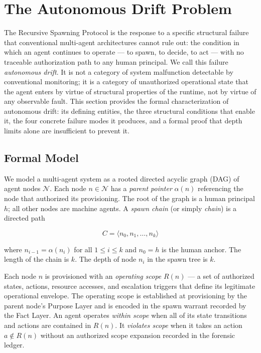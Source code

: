 \section{The Autonomous Drift Problem}
\label{sec:rs-drift}

The Recursive Spawning Protocol is the response to a specific structural failure that conventional multi-agent architectures cannot rule out: the condition in which an agent continues to operate — to spawn, to decide, to act — with no traceable authorization path to any human principal. We call this failure \emph{autonomous drift}. It is not a category of system malfunction detectable by conventional monitoring; it is a category of unauthorized operational state that the agent enters by virtue of structural properties of the runtime, not by virtue of any observable fault. This section provides the formal characterization of autonomous drift: its defining entities, the three structural conditions that enable it, the four concrete failure modes it produces, and a formal proof that depth limits alone are insufficient to prevent it.

\subsection{Formal Model}

We model a multi-agent system as a rooted directed acyclic graph (DAG) of agent nodes $\mathcal{N}$. Each node $n \in \mathcal{N}$ has a \emph{parent pointer} $\alpha(n)$ referencing the node that authorized its provisioning. The root of the graph is a human principal $h$; all other nodes are machine agents. A \emph{spawn chain} (or simply \emph{chain}) is a directed path

\[
C = \langle n_0, n_1, \ldots, n_k \rangle
\]

where $n_{i-1} = \alpha(n_i)$ for all $1 \leq i \leq k$ and $n_0 = h$ is the human anchor. The length of the chain is $k$. The depth of node $n_i$ in the spawn tree is $k$.

Each node $n$ is provisioned with an \emph{operating scope} $R(n)$ — a set of authorized states, actions, resource accesses, and escalation triggers that define its legitimate operational envelope. The operating scope is established at provisioning by the parent node's Purpose Layer and is encoded in the spawn warrant recorded by the Fact Layer. An agent operates \emph{within scope} when all of its state transitions and actions are contained in $R(n)$. It \emph{violates scope} when it takes an action $a \notin R(n)$ without an authorized scope expansion recorded in the forensic ledger.

